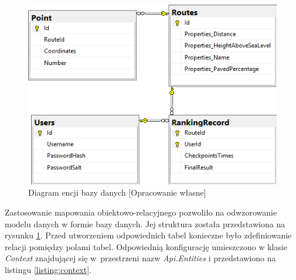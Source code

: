 \begin{figure}[h]
\begin{center}
\includegraphics{img/er-diagram.png}
\caption{Diagram encji bazy danych [Opracowanie własne]}\label{image:db-structure}
\end{center}
\end{figure}

Zastosowanie mapowania obiektowo-relacyjnego pozwoliło na odwzorowanie modelu danych w formie bazy danych. Jej struktura została przedstawiona na rysunku \ref{image:db-structure}. Przed utworzeniem odpowiednich tabel konieczne było zdefiniowanie relacji pomiędzy polami tabel. Odpowiednią konfigurację umieszczono w klasie \textit{Context} znajdującej się w~przestrzeni nazw \textit {Api.Entities} i przedstawiono na listingu \ref{listing:context}.

